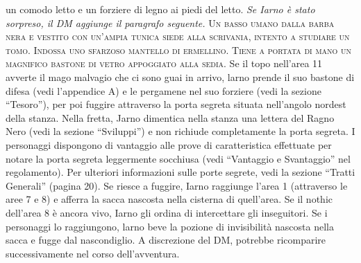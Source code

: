\documentclass{article}
\begin{document}
\begin{enumerate}
{un comodo letto e un forziere di legno ai piedi del letto. }
\textit{Se Iarno è stato sorpreso, il DM aggiunge il
paragrafo seguente.} \textsc{Un basso umano dalla barba nera e vestito con un'ampia
tunica siede alla scrivania, intento a studiare un tomo. Indossa
uno sfarzoso mantello di ermellino. Tiene a portata di mano
un magnifico bastone di vetro appoggiato alla sedia.}
Se il topo nell’area 11 avverte il mago malvagio che ci
sono guai in arrivo, larno prende il suo bastone di difesa
(vedi l’appendice A) e le pergamene nel suo forziere (vedi
la sezione “Tesoro”), per poi fuggire attraverso la porta
segreta situata nell'angolo nordest della stanza. Nella fretta,
Jarno dimentica nella stanza una lettera del Ragno Nero
(vedi la sezione “Sviluppi”) e non richiude completamente
la porta segreta. I personaggi dispongono di vantaggio alle
prove di caratteristica effettuate per notare la porta segreta
leggermente socchiusa (vedi “Vantaggio e Svantaggio” nel
regolamento). Per ulteriori informazioni sulle porte segrete,
vedi la sezione “Tratti Generali” (pagina 20).
Se riesce a fuggire, Iarno raggiunge l’area 1 (attraverso
le aree 7 e 8) e afferra la sacca nascosta nella cisterna di
quell’area. Se il nothic dell’area 8 è ancora vivo, Iarno gli
ordina di intercettare gli inseguitori. Se i personaggi lo
raggiungono, larno beve la pozione di invisibilità nascosta
nella sacca e fugge dal nascondiglio. A discrezione del
DM, potrebbe ricomparire successivamente nel corso
dell'avventura.


\end{enumerate}
\end{document}
